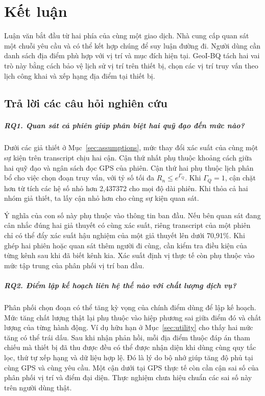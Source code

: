\chapter{Kết luận}\label{ch:summary}
Luận văn bắt đầu từ hai phía của cùng một giao dịch. Nhà cung cấp quan sát một chuỗi yêu cầu và có
thể kết hợp chúng để suy luận đường đi. Người dùng cần danh sách địa điểm phù hợp với vị trí và
mục đích hiện tại. GeoI-BQ tách hai vai trò này bằng cách bảo vệ lịch sử vị trí trên thiết bị,
chọn các vị trí truy vấn theo lịch công khai và xếp hạng địa điểm tại thiết bị.

\section{Trả lời các câu hỏi nghiên cứu}
\paragraph{RQ1. Quan sát cả phiên giúp phân biệt hai quỹ đạo đến mức nào?}
Dưới các giả thiết ở Mục~\ref{sec:assumptions}, mức thay đổi xác suất của cùng một sự kiện trên
transcript chịu hai cận. Cận thứ nhất phụ thuộc khoảng cách giữa hai quỹ đạo và ngân sách đọc GPS
của phiên. Cận thứ hai phụ thuộc lịch phân bổ cho việc chọn đoạn truy vấn, với tỷ số tối đa
$R_n\le e^{\Gamma_Q}$. Khi $\Gamma_Q=1$, cận chặt hơn từ tích các hệ số nhỏ hơn 2,437372 cho
mọi độ dài phiên. Khi thỏa cả hai nhóm giả thiết, ta lấy cận nhỏ hơn cho cùng sự kiện quan sát.

Ý nghĩa của con số này phụ thuộc vào thông tin ban đầu. Nếu bên quan sát đang cân nhắc đúng hai
giả thuyết có cùng xác suất, riêng transcript của một phiên chỉ có thể đẩy xác suất hậu nghiệm
của một giả thuyết lên dưới 70,91\%. Khi ghép hai phiên hoặc quan sát thêm người đi cùng, cần
kiểm tra điều kiện của từng kênh sau khi đã biết kênh kia. Xác suất định vị thực tế còn phụ thuộc
vào mức tập trung của phân phối vị trí ban đầu.

\paragraph{RQ2. Điểm lập kế hoạch liên hệ thế nào với chất lượng dịch vụ?}
Phân phối chọn đoạn có thể tăng kỳ vọng của chính điểm dùng để lập kế hoạch. Mức tăng chất lượng
thật lại phụ thuộc vào hiệp phương sai giữa điểm đó và chất lượng của từng hành động. Ví dụ
hữu hạn ở Mục~\ref{sec:utility} cho thấy hai mức tăng có thể trái dấu. Sau khi nhận phản hồi,
mỗi địa điểm thuộc đáp án tham chiếu mà thiết bị đã thu được đều có thể được nhận diện khi dùng
cùng quy tắc lọc, thứ tự xếp hạng và dữ liệu hợp lệ. Đó là lý do bộ nhớ giúp tăng độ phủ tại cùng
GPS và cùng yêu cầu. Một cận dưới tại GPS thực tế còn cần cận sai số của phân phối vị trí và điểm
đại diện. Thực nghiệm chưa hiệu chuẩn các sai số này trên người dùng thật.

